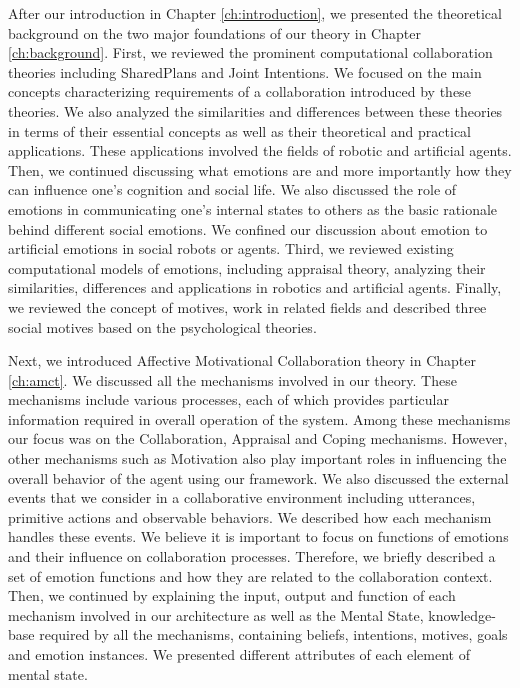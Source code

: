 \documentclass[12pt]{report}
\begin{document}
After our introduction in Chapter \ref{ch:introduction}, we presented the
theoretical background on the two major foundations of our theory in Chapter
\ref{ch:background}. First, we reviewed the prominent computational
collaboration theories including SharedPlans and Joint Intentions. We focused on
the main concepts characterizing requirements of a collaboration introduced by
these theories. We also analyzed the similarities and differences between these
theories in terms of their essential concepts as well as their theoretical and
practical applications. These applications involved the fields of robotic and
artificial agents. Then, we continued discussing what emotions are and more
importantly how they can influence one's cognition and social life. We also
discussed the role of emotions in communicating one's internal states to others
as the basic rationale behind different social emotions. We confined our
discussion about emotion to artificial emotions in social robots or agents.
Third, we reviewed existing computational models of emotions, including
appraisal theory, analyzing their similarities, differences and applications in
robotics and artificial agents. Finally, we reviewed the concept of motives,
work in related fields and described three social motives based on the
psychological theories.

Next, we introduced Affective Motivational Collaboration theory in Chapter
\ref{ch:amct}. We discussed all the mechanisms involved in our theory. These
mechanisms include various processes, each of which provides particular
information required in overall operation of the system. Among these mechanisms
our focus was on the Collaboration, Appraisal and Coping mechanisms. However,
other mechanisms such as Motivation also play important roles in influencing the
overall behavior of the agent using our framework. We also discussed the
external events that we consider in a collaborative environment including
utterances, primitive actions and observable behaviors. We described how each
mechanism handles these events. We believe it is important to focus on functions
of emotions and their influence on collaboration processes. Therefore, we
briefly described a set of emotion functions and how they are related to the
collaboration context. Then, we continued by explaining the input, output and
function of each mechanism involved in our architecture as well as the Mental
State, knowledge-base required by all the mechanisms, containing beliefs,
intentions, motives, goals and emotion instances. We presented different
attributes of each element of mental state.
\end{document}
